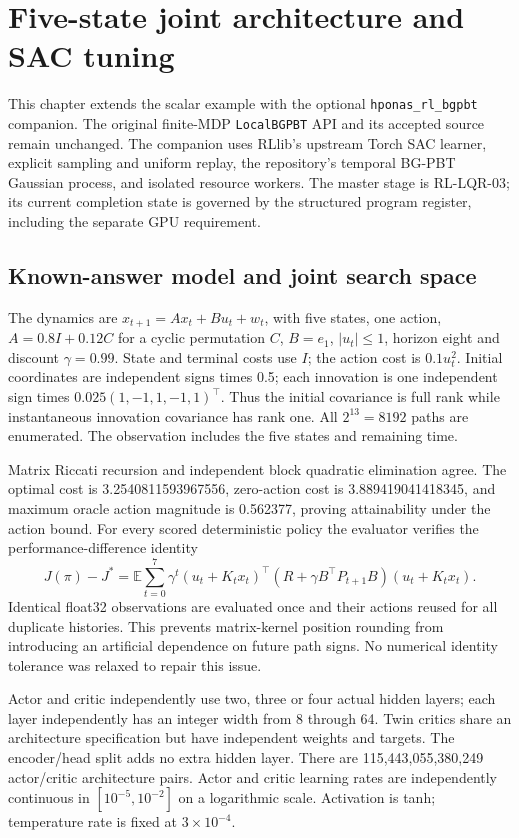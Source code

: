 \chapter{Five-state joint architecture and SAC tuning}
\label{sec:lqr5-bgpbt}

This chapter extends the scalar example with the optional
\texttt{hponas\_rl\_bgpbt} companion. The original finite-MDP
\texttt{LocalBGPBT} API and its accepted source remain unchanged. The companion
uses RLlib's upstream Torch SAC learner, explicit sampling and uniform replay,
the repository's temporal BG-PBT Gaussian process, and isolated resource workers.
The master stage is RL-LQR-03; its current completion state is governed by the
structured program register, including the separate GPU requirement.

\section{Known-answer model and joint search space}
The dynamics are $x_{t+1}=Ax_t+Bu_t+w_t$, with five states, one action,
$A=0.8I+0.12C$ for a cyclic permutation $C$, $B=e_1$, $|u_t|\leq1$,
horizon eight and discount $\gamma=0.99$. State and terminal costs use $I$;
the action cost is $0.1u_t^2$. Initial coordinates are independent signs times
0.5; each innovation is one independent sign times
$0.025(1,-1,1,-1,1)^\top$. Thus the initial covariance is full rank while
instantaneous innovation covariance has rank one. All $2^{13}=8192$ paths
are enumerated. The observation includes the five states and remaining time.

Matrix Riccati recursion and independent block quadratic elimination agree.
The optimal cost is 3.2540811593967556, zero-action cost is 3.889419041418345,
and maximum oracle action magnitude is 0.562377, proving attainability under
the action bound. For every scored deterministic policy the evaluator verifies
the performance-difference identity
\[
 J(\pi)-J^*=\mathbb{E}\sum_{t=0}^{7}\gamma^t
 (u_t+K_tx_t)^\top(R+\gamma B^\top P_{t+1}B)(u_t+K_tx_t).
\]
Identical float32 observations are evaluated once and their actions reused for
all duplicate histories. This prevents matrix-kernel position rounding from
introducing an artificial dependence on future path signs. No numerical
identity tolerance was relaxed to repair this issue.

Actor and critic independently use two, three or four actual hidden layers;
each layer independently has an integer width from 8 through 64. Twin critics
share an architecture specification but have independent weights and targets.
The encoder/head split adds no extra hidden layer. There are
115,443,055,380,249 actor/critic architecture pairs. Actor and critic learning
rates are independently continuous in $[10^{-5},10^{-2}]$ on a logarithmic scale.
Activation is tanh; temperature rate is fixed at $3\times10^{-4}$.

